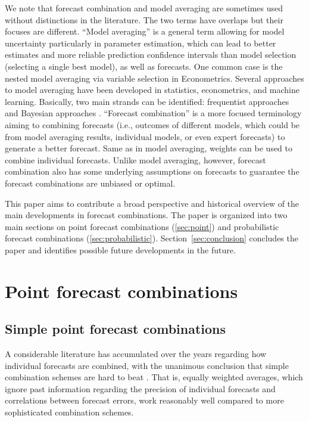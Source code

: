 \documentclass[a4paper,11pt]{article}
\begin{document}
We note that forecast combination and model averaging are sometimes used without distinctions in the literature. The two terms have overlaps but their focuses are different. ``Model averaging'' is a general term allowing for model uncertainty particularly in parameter estimation, which can lead to better estimates and more reliable prediction confidence intervals than model selection (selecting a single best model), as well as forecasts. One common case is the nested model averaging via variable selection in Econometrics. Several approaches to model averaging have been developed in statistics, econometrics, and machine learning. Basically, two main strands can be identified: frequentist approaches \citep[e.g.,][]{Fletcher2018-ma} and Bayesian approaches \citep[e.g.][]{Steel2020-ma}.  ``Forecast combination'' is a more focused terminology aiming to combining forecasts (i.e., outcomes of different models, which could be from model averaging results, individual models, or even expert forecasts) to generate a better forecast. Same as in model averaging, weights can be used to combine individual forecasts. Unlike model averaging, however, forecast combination also has some underlying assumptions on forecasts to guarantee the forecast combinations are unbiased or optimal.

This paper aims to contribute a broad perspective and historical overview of the main developments in forecast combinations. The paper is organized into two main sections on point forecast combinations (\autoref{sec:point}) and probabilistic forecast combinations (\autoref{sec:probabilistic}). Section~\ref{sec:conclusion} concludes the paper and identifies possible future developments in the future.


\section{Point forecast combinations}
\label{sec:point}

\subsection{Simple point forecast combinations}
\label{sec:simple_comb}

A considerable literature has accumulated over the years regarding how individual forecasts are combined, with the unanimous conclusion that simple combination schemes are hard to beat \citep{Kang1986-kq,Clemen1989-fb,Fischer1999-kz,Stock2004-rq,Lichtendahl2020-ut}. That is, equally weighted averages, which ignore past information regarding the precision of individual forecasts and correlations between forecast errors, work reasonably well compared to more sophisticated combination schemes.
\end{document}
